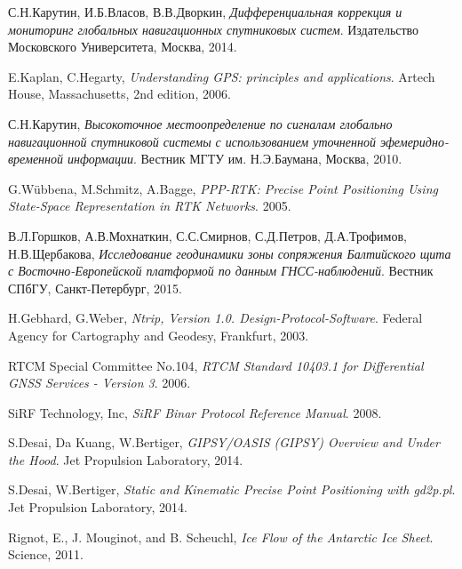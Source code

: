 \documentclass[a4paper,12pt]{report}
\begin{document}
\newpage
{}
\begin{thebibliography}{9}

	С.Н.Карутин, И.Б.Власов, В.В.Дворкин, 
	\emph{Дифференциальная коррекция и мониторинг глобальных навигационных спутниковых систем}.
	Издательство Московского Университета, Москва,
	2014.
	
    E.Kaplan, C.Hegarty,
    \emph{Understanding GPS: principles and applications}.
    Artech House, Massachusetts,
    2nd edition,
    2006.

	С.Н.Карутин,
	\emph{Высокоточное местоопределение по сигналам глобально навигационной спутниковой системы с использованием уточненной эфемеридно-
	временной информации}.
	Вестник МГТУ им. Н.Э.Баумана, Москва,
	2010.

	G.W\"{u}bbena, M.Schmitz, A.Bagge,
	\emph{PPP-RTK: Precise Point Positioning Using State-Space Representation in RTK Networks}.
	2005.

	В.Л.Горшков, А.В.Мохнаткин, С.С.Смирнов, С.Д.Петров, Д.А.Трофимов, Н.В.Щербакова, 
    \emph{Исследование геодинамики зоны сопряжения Балтийского щита с Восточно-Европейской платформой по данным ГНСС-наблюдений}.
	Вестник СПбГУ, Санкт-Петербург,
    2015.

	H.Gebhard, G.Weber,
	\emph{Ntrip, Version 1.0. Design-Protocol-Software}.
	Federal Agency for Cartography and Geodesy, Frankfurt,
	2003.

	RTCM Special Committee No.104,
	\emph{RTCM Standard 10403.1 for Differential GNSS Services - Version 3}.
	2006.

	SiRF Technology, Inc,
	\emph{SiRF Binar Protocol Reference Manual}.
	2008.

    S.Desai, Da Kuang, W.Bertiger, 
	\emph{GIPSY/OASIS (GIPSY) Overview and Under the Hood}.
	Jet Propulsion Laboratory,
	2014.

	S.Desai, W.Bertiger,
	\emph{Static and Kinematic Precise Point Positioning with gd2p.pl}.
	Jet Propulsion Laboratory,
	2014.
		
	Rignot, E., J. Mouginot, and B. Scheuchl,
	\emph{Ice Flow of the Antarctic Ice Sheet}. 
	Science,
	2011.


\end{thebibliography}
\end{document}
